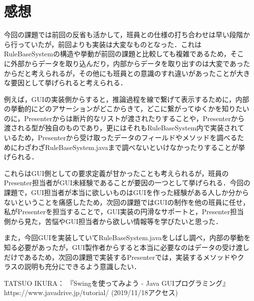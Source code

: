 \documentclass[12pt]{jarticle}
\begin{document}
\section{感想}
今回の課題では前回の反省も活かして，班員との仕様の打ち合わせは早い段階から行っていたが，前回よりも実装は大変なものとなった．これはRuleBaseSystemの構造や挙動が前回の課題と比較しても複雑であるため，そこに外部からデータを取り込んだり，内部からデータを取り出すのは大変であったからだと考えられるが，その他にも班員との意識のすれ違いがあったことが大きな要因として挙げられると考えられる．

例えば，GUIの実装側からすると，推論過程を線で繋げて表示するために，内部の挙動的にどのアサーションがどこからきて，どこに繋がってゆくかを知りたいのに，Presenterからは断片的なリストが渡されたりすることや，Presenterから渡される型が独自のものであり，更にはそれもRuleBaseSystem内で実装されているため，Presenterから受け取ったデータのフィールドやメソッドを調べるためにわざわざRuleBaseSystem.javaまで調べないといけなかったりすることが挙げられる．

これらはGUI側としての要求定義が甘かったことも考えられるが，班員のPresenter担当者がGUI未経験であることが要因の一つとして挙げられる．今回の課題で，GUI担当者が本当に欲しいものはGUIを作った経験がある人しか分からないということを痛感したため，次回の課題ではGUIの制作を他の班員に任せ，私がPresenterを担当することで，GUI実装の円滑なサポートと，Presenter担当側から見た，苦悩やGUI担当者から欲しい情報等を学びたいと思った．

また，今回GUIを実装していてRuleBaseSystem.javaをしばし調べ，内部の挙動を知る必要があったが，GUI製作者からすると本当に必要なのはデータの受け渡しだけであるため，次回の課題で実装するPresenterでは，実装するメソッドやクラスの説明も充分にできるよう意識したい．

\begin{thebibliography}{99}
TATSUO IKURA： 『Swingを使ってみよう - Java GUIプログラミング』 https://www.javadrive.jp/tutorial/ (2019/11/18アクセス) \\
\end{thebibliography}
\end{document}
